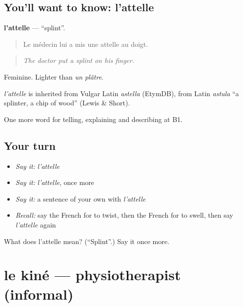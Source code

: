 \subsection*{You'll want to know: l'attelle}
\textbf{l'attelle} — \textquotedblleft{}splint\textquotedblright{}.

\begin{quote}
Le médecin lui a mis une attelle au doigt.
\end{quote}

\begin{quote}
\emph{The doctor put a splint on his finger.}
\end{quote}

Feminine. Lighter than \emph{un plâtre}.

\begin{cousinweb}
\emph{l'attelle} is inherited from Vulgar Latin \emph{astella} (EtymDB), from Latin \emph{astula} \textquotedblleft{}a splinter, a chip of wood\textquotedblright{} (Lewis \& Short).
\end{cousinweb}

\begin{grammarlens}[title={What you've built}]
One more word for telling, explaining and describing at B1.
\end{grammarlens}

\subsection*{Your turn}
\begin{itemize}
\raggedright
  \item \emph{Say it:} \emph{l'attelle}
  \item \emph{Say it:} \emph{l'attelle}, once more
  \item \emph{Say it:} a sentence of your own with \emph{l'attelle}
  \item \emph{Recall:} say the French for to twist, then the French for to swell, then say \emph{l'attelle} again
\end{itemize}

\begin{tcolorbox}[breakable,colback=teal!4,colframe=teal!35!black,title={Before you move on}]
What does l'attelle mean? (\textquotedblleft{}Splint\textquotedblright{}.) Say it once more.
\end{tcolorbox}
\section[le kiné]{le kiné — physiotherapist (informal)}


